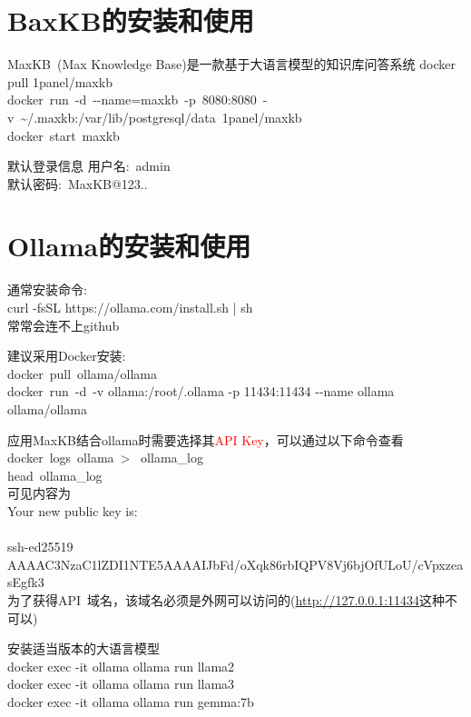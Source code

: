 \documentclass[10pt,a4paper]{article}
\begin{document}
\section{\rm{BaxKB}的安装和使用}
\textrm{MaxKB~(Max Knowledge Base)}是一款基于大语言模型的知识库问答系统
\textrm{docker pull 1panel/maxkb}\\
\textrm{docker~run~-d~-\/-name=maxkb~-p~8080:8080~-v~\sim/.maxkb:/var/lib/postgresql/data~1panel/maxkb}\\
\textrm{docker~start~maxkb}

默认登录信息
用户名:~\textrm{admin}\\
默认密码:~\textrm{MaxKB@123..}

\section{\rm{Ollama}的安装和使用}
通常安装命令:\\
\textrm{curl -fsSL https://ollama.com/install.sh | sh}\\
常常会连不上\textrm{github}

建议采用\textrm{Docker}安装:\\
\textrm{docker~pull~ollama/ollama}\\
\textrm{docker~run~-d~-v ollama:/root/.ollama -p 11434:11434 -\/-name ollama ollama/ollama}

应用\textrm{MaxKB}结合\textrm{ollama}时需要选择其\textcolor{red}{\textrm{API Key}}，可以通过以下命令查看\\
\textrm{docker~logs~ollama~>~ ollama\_log}\\
\textrm{head~ollama\_log}\\
可见内容为\\
\textrm{Your new public key is:\\
\\
ssh-ed25519 AAAAC3NzaC1lZDI1NTE5AAAAIJbFd/oXqk86rbIQPV8Vj6bjOfULoU/cVpxzeasEgfk3}\\

为了获得\textrm{API}~域名，该域名必须是外网可以访问的\textrm{(\url{http://127.0.0.1:11434}这种不可以)}

安装适当版本的大语言模型\\
\textrm{docker exec -it ollama ollama run llama2}\\
\textrm{docker exec -it ollama ollama run llama3}\\
\textrm{docker exec -it ollama ollama run gemma:7b} %
\end{document}
